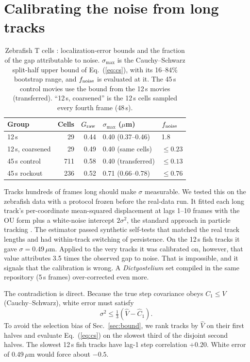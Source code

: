 \documentclass[aps,pre,10pt,twocolumn,superscriptaddress,amsmath,amssymb,floatfix]{revtex4-2}
\begin{document}
\section{Calibrating the noise from long tracks}
\label{sec:calib}

\begin{table}[tbp]
\caption{Zebrafish T cells \cite{Jerison2020}: localization-error bounds and the fraction of the gap attributable to noise. $\sigma_{\max}$ is the Cauchy--Schwarz split-half upper bound of Eq.~(\ref{eq:cs}), with its 16--84\% bootstrap range, and $f_{\rm noise}$ is evaluated at it. The 45\,s control movies use the bound from the 12\,s movies (transferred). ``12\,s, coarsened'' is the 12\,s cells sampled every fourth frame (48\,s).}
\label{tab:fish}
\begin{ruledtabular}
\begin{tabular}{lrrll}
Group & Cells & $G_{\rm raw}$ & $\sigma_{\max}$ ($\mu$m) & $f_{\rm noise}$\\
\hline
12\,s & 29 & 0.44 & 0.40 (0.37--0.46) & 1.8\\
12\,s, coarsened & 29 & 0.49 & 0.40 (same cells) & $\le0.23$\\
45\,s control & 711 & 0.58 & 0.40 (transferred) & $\le0.13$\\
45\,s rockout & 236 & 0.52 & 0.71 (0.66--0.78) & $\le0.76$\\
\end{tabular}
\end{ruledtabular}
\end{table}

Tracks hundreds of frames long should make $\sigma$ measurable. We tested this on the zebrafish data with a protocol frozen before the real-data run. It fitted each long track's per-coordinate mean-squared displacement at lags 1--10 frames with the OU form plus a white-noise intercept $2\sigma^2$, the standard approach in particle tracking \cite{Michalet2010}. The estimator passed synthetic self-tests that matched the real track lengths and had within-track switching of persistence. On the 12\,s fish tracks it gave $\sigma=0.49$\,$\mu$m. Applied to the very tracks it was calibrated on, however, that value attributes 3.5 times the observed gap to noise. That is impossible, and it signals that the calibration is wrong. A \emph{Dictyostelium} set compiled in the same repository (5\,s frames) over-corrected even more.

The contradiction is direct. Because the true step covariance obeys $C_1\le V$ (Cauchy--Schwarz), white error must satisfy
\begin{equation}
\sigma^2\le\tfrac13\left(\hat V-\hat C_1\right).
\label{eq:cs}
\end{equation}
To avoid the selection bias of Sec.~\ref{sec:bound}, we rank tracks by $\hat V$ on their first halves and evaluate Eq.~(\ref{eq:cs}) on the slowest third of the disjoint second halves. The slowest 12\,s fish tracks have lag-1 step correlation $+0.20$. White error of 0.49\,$\mu$m would force about $-0.5$.
\end{document}
